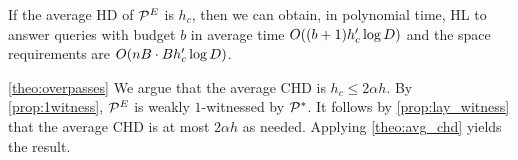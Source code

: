 \begin{theorem}\label{theo:avg_chd}
If the average HD of $\mathcal{P}^E$ is $h_c$, then we can obtain, in polynomial time, HL to answer queries with budget $b$ in average time $O((b+1)h_c'\log D)$ and the space requirements are $O(nB\cdot Bh_c'\log D)$.
\end{theorem}

\begin{proofof}{\cref{theo:overpasses}}
We argue that the average CHD is $h_c\leq 2\alpha h$.
By \cref{prop:1witness}, $\mathcal{P}^E$ is weakly $1$-witnessed by $\mathcal{P}^*$.
It follows by \cref{prop:lay_witness} that the average CHD is at most $2\alpha h$ as needed.
Applying \cref{theo:avg_chd} yields the result.
\end{proofof}